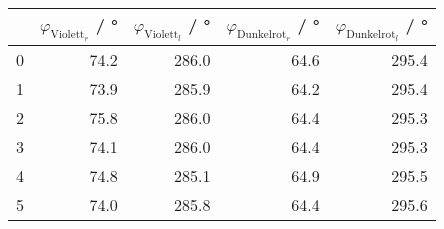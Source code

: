 \begin{tabular}{lrrrr}
\toprule
{} &  $\varphi_{\text{Violett}_r}$ / \si{\degree} &  $\varphi_{\text{Violett}_l}$ / \si{\degree} &  $\varphi_{\text{Dunkelrot}_r}$ / \si{\degree} &  $\varphi_{\text{Dunkelrot}_l}$ / \si{\degree} \\
\midrule
0 &                                         74.2 &                                        286.0 &                                           64.6 &                                          295.4 \\
1 &                                         73.9 &                                        285.9 &                                           64.2 &                                          295.4 \\
2 &                                         75.8 &                                        286.0 &                                           64.4 &                                          295.3 \\
3 &                                         74.1 &                                        286.0 &                                           64.4 &                                          295.3 \\
4 &                                         74.8 &                                        285.1 &                                           64.9 &                                          295.5 \\
5 &                                         74.0 &                                        285.8 &                                           64.4 &                                          295.6 \\
\bottomrule
\end{tabular}
